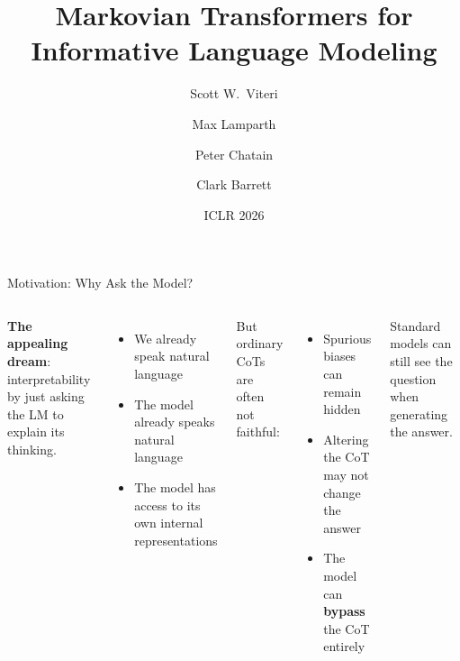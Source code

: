 \documentclass[aspectratio=169]{beamer}
\title{Markovian Transformers for\\Informative Language Modeling}
\author{Scott W.\ Viteri \and Max Lamparth \and Peter Chatain \and Clark Barrett}
\institute{Stanford University}
\date{ICLR 2026}
\begin{document}
\begin{frame}[plain]
\maketitle
\end{frame}

\begin{frame}{Motivation: Why Ask the Model?}

\begin{columns}[T]
\small
\textbf{The appealing dream}: interpretability by just asking the LM to explain its thinking.

\begin{itemize}
    \itemsep 0.15em
    \item We already speak natural language
    \item The model already speaks natural language
    \item The model has access to its own internal representations
\end{itemize}

But ordinary CoTs are often \alert{not faithful}:
\begin{itemize}
    \itemsep 0.15em
    \item Spurious biases can remain hidden
    \item Altering the CoT may not change the answer
    \item The model can \textbf{bypass} the CoT entirely
\end{itemize}


\vspace{0.15cm}
{\small\color{red} Standard models can still see the question when generating the answer.}
\end{columns}
\end{frame}
\end{document}
